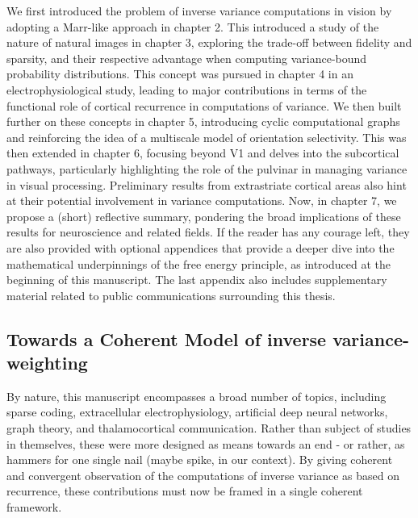 We first introduced the problem of inverse variance computations in vision by adopting a Marr-like approach in chapter 2. This introduced a study of the nature of natural images in chapter 3, exploring the trade-off between fidelity and sparsity, and their respective advantage when computing variance-bound probability distributions. 
This concept was pursued in chapter 4 in an electrophysiological study, leading to major contributions in terms of the functional role of cortical recurrence in computations of variance. 
We then built further on these concepts in chapter 5, introducing cyclic computational graphs and reinforcing the idea of a multiscale model of orientation selectivity.
This was then extended in chapter 6, focusing beyond \gls{V1} and delves into the subcortical pathways, particularly highlighting the role of the pulvinar in managing variance in visual processing. Preliminary results from extrastriate cortical areas also hint at their potential involvement in variance computations.
Now, in chapter 7, we propose a (short) reflective summary, pondering the broad implications of these results for neuroscience and related fields. If the reader has any courage left, they are also provided with optional appendices that provide a deeper dive into the mathematical underpinnings of the free energy principle, as introduced at the beginning of this manuscript. The last appendix also includes supplementary material related to public communications surrounding this thesis.



\subsection{Towards a Coherent Model of inverse variance-weighting}
By nature, this manuscript encompasses a broad number of topics, including sparse coding, extracellular electrophysiology, artificial deep neural networks, graph theory, and thalamocortical communication. Rather than subject of studies in themselves, these were more designed as means towards an end - or rather, as hammers for one single nail (maybe spike, in our context). By giving coherent and convergent observation of the computations of inverse variance as based on recurrence, these contributions must now be framed in a single coherent framework.

